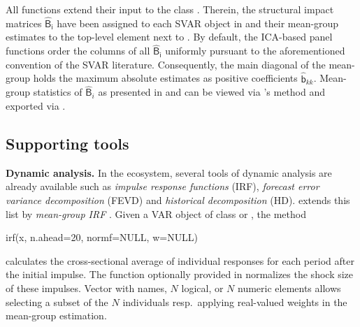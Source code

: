 All \mbox{} functions extend their  input to the class . Therein, the structural impact matrices $ \mathsf{\widehat{B}_i} $ have been assigned to each SVAR object in  and their mean-group estimates to the top-level element  next to . By default, the ICA-based panel functions order the columns of all $ \mathsf{\widehat{B}_i} $ uniformly pursuant to the aforementioned convention of the SVAR literature. Consequently, the main diagonal of the mean-group  holds the maximum absolute estimates as positive coefficients $ \mathsf{\widehat{b}}_{kk} $. Mean-group statistics of $ \widehat{\mathsf{B}}_i $ as presented in \citet{BernothHerwartz2021} and \citet{HerwartzWang2024} can be viewed via 's  method and exported via .


\subsection{Supporting tools} \label{sec:supp}
\textbf{Dynamic analysis.} In the  ecosystem, several tools of dynamic analysis are already available such as \textit{impulse response functions} (IRF), \textit{forecast error variance decomposition} (FEVD) and \textit{historical decomposition} (HD).  extends this list by \textit{mean-group IRF} \citep[p.~627]{GambacortaEtAl2014}. Given a VAR object  of class  or , the method 
\begin{CodeChunk}
\begin{CodeInput}
irf(x, n.ahead=20, normf=NULL, w=NULL)
\end{CodeInput}
\end{CodeChunk}
calculates the cross-sectional average of individual responses for each period after the initial impulse. The function optionally provided in  normalizes the shock size of these impulses. Vector  with names, $ N $ logical, or $ N $ numeric elements allows selecting a subset of the $ N $ individuals resp.~applying real-valued weights in the mean-group estimation.


